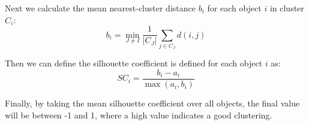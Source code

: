 \documentclass[12pt, english, course]{lecture}
\begin{document}
Next we calculate the mean nearest-cluster distance $b_i$ for each object $i$ in cluster $C_i$:
\[
    b_i = \min_{J \neq I} \frac{1}{|C_J|} \sum_{j \in C_J} d(i, j)
\]

Then we can define the silhouette coefficient is defined for each object $i$ as:
\[
    SC_i = \frac{b_i - a_i}{\max(a_i, b_i)}
\]

Finally, by taking the mean silhouette coefficient over all objects, the final value will be between -1 and 1,
where a high value indicates a good clustering.
\end{document}
